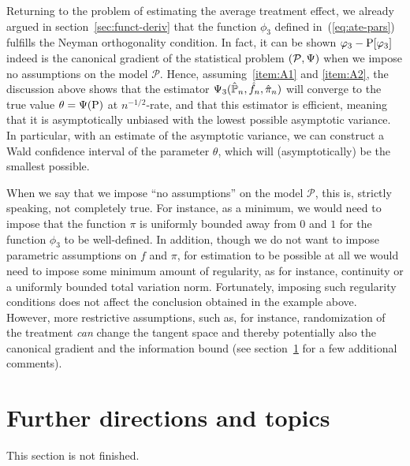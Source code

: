 \documentclass[a4,danish]{article}
\begin{document}
\begin{example}
  \label{example:effi-ate}
  Returning to the problem of estimating the average treatment effect, we already argued in
  section~\ref{sec:funct-deriv} that the function $\phi_3$ defined in~(\ref{eq:ate-pars}) fulfills
  the Neyman orthogonality condition. In fact, it can be shown $\phi_3 - \P[\phi_3]$ indeed is the
  canonical gradient of the statistical problem $(\mathcal{P}, \TT)$ when we impose no assumptions
  on the model $\mathcal{P}$. Hence, assuming~\ref{item:A1} and \ref{item:A2}, the discussion above
  shows that the estimator $\TT_3(\empmeas, \hat{f}_n, \hat{\pi}_n)$ will converge to the true value
  $\theta=\TT(\P)$ at $n^{-1/2}$-rate, and that this estimator is efficient, meaning that it is
  asymptotically unbiased with the lowest possible asymptotic variance. In particular, with an
  estimate of the asymptotic variance, we can construct a Wald confidence interval of the parameter
  $\theta$, which will (asymptotically) be the smallest possible. 
\end{example}

\begin{remark}
  When we say that we impose ``no assumptions'' on the model $\mathcal{P}$, this is, strictly
  speaking, not completely true. For instance, as a minimum, we would need to impose that the
  function $\pi$ is uniformly bounded away from $0$ and $1$ for the function $\phi_3$ to be
  well-defined. In addition, though we do not want to impose parametric assumptions on $f$ and
  $\pi$, for estimation to be possible at all we would need to impose some minimum amount of
  regularity, as for instance, continuity or a uniformly bounded total variation norm. Fortunately,
  imposing such regularity conditions does not affect the conclusion obtained in the example above.
  However, more restrictive assumptions, such as, for instance, randomization of the treatment
  \textit{can} change the tangent space and thereby potentially also the canonical gradient and the
  information bound (see section~\ref{sec:further-directions} for a few additional comments).
\end{remark} 

\section{Further directions and topics}
\label{sec:further-directions}

This section is not finished. 
\end{document}
